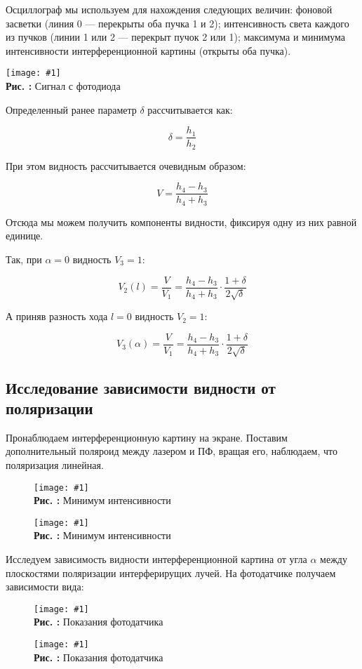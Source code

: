 \documentclass[12pt,a4paper]{article}
\newcounter{picture}
\newcommand{\embed}[3]{\begin{center}
		\texttt{[image: \#1]}
		\\\textbf{Рис. \thepicture:} #3
		\label{pic_\thepicture}
		\addtocounter{picture}{1}
\end{center}}
\begin{document}
	Осциллограф мы используем для нахождения следующих величин: фоновой засветки (линия 0 --- перекрыты оба пучка 1 и 2); интенсивность света каждого из пучков (линии 1 или 2 --- перекрыт пучок 2 или 1); максимума и минимума интенсивности интерференционной картины (открыты оба пучка).
	
	\embed{PIC_3.png}{0.17}{Сигнал с фотодиода}
	
	Определенный ранее параметр $\delta$ рассчитывается как:
	
	$$ \delta = \dfrac{h_1}{h_2} $$
	
	При этом видность рассчитывается очевидным образом:
	
	$$ V = \dfrac{h_4 - h_3}{h_4 + h_3} $$
	
	Отсюда мы можем получить компоненты видности, фиксируя одну из них равной единице.
	
	Так, при $ \alpha = 0$ видность $ V_3 = 1 $:
	
	$$ V_2 (l) = \dfrac{V}{V_1} = \dfrac{h_4 - h_3}{h_4 + h_3} \cdot \dfrac{1 + \delta}{2\sqrt{\delta}} $$
	
	А приняв разность хода $ l = 0 $ видность $ V_2 = 1 $:
	
	$$ V_3(\alpha) = \dfrac{V}{V_1} = \dfrac{h_4 - h_3}{h_4 + h_3} \cdot \dfrac{1 + \delta}{2\sqrt{\delta}} $$
	
	\subsection{Исследование зависимости видности от поляризации}
	
	Пронаблюдаем интерференционную картину на экране. Поставим дополнительный поляроид между лазером и ПФ, вращая его, наблюдаем, что поляризация линейная.
	
	\begin{figure}[h]
		\begin{minipage}{0.5\linewidth}
			\embed{PIC_4.png}{0.045, angle=-90}{Минимум интенсивности}
		\end{minipage}
		\begin{minipage}{0.5\linewidth}
			\embed{PIC_5.png}{0.045, angle=-90}{Минимум интенсивности}
		\end{minipage}
	\end{figure}

	Исследуем зависимость видности интерференционной картина от угла $\alpha$ между плоскостями поляризации интерферирущих лучей. На фотодатчике получаем зависимости вида:
	
	\begin{figure}[h]
		\begin{minipage}{0.5\linewidth}
			\embed{PIC_6.png}{0.06}{Показания фотодатчика}
		\end{minipage}
		\begin{minipage}{0.5\linewidth}
			\embed{PIC_7.png}{0.050}{Показания фотодатчика}
		\end{minipage}
	\end{figure}
	
\end{document}
